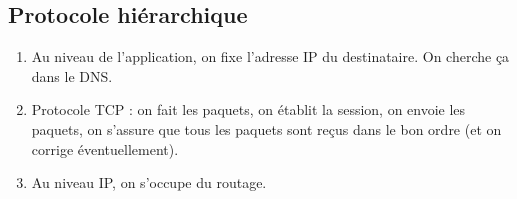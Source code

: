 \documentclass[12pt,a4paper]{report}
\begin{document}
\subsection{Protocole hiérarchique}
\begin{enumerate}
\item Au niveau de l'application, on fixe l'adresse IP du destinataire. On cherche ça dans le DNS.
\item Protocole TCP :  on fait les paquets, on établit la session, on envoie les paquets, on s'assure que tous les paquets sont reçus dans le bon ordre (et on corrige éventuellement).
\item Au niveau IP, on s'occupe du routage.
\end{enumerate}
\end{document}
